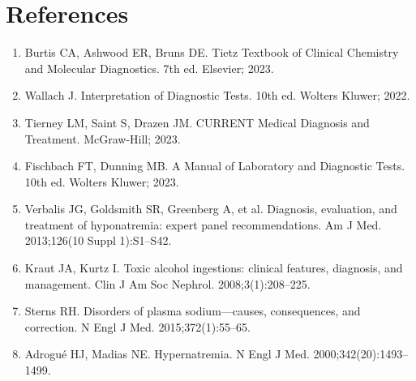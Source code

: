 \section*{References}
\begin{enumerate}
  \item Burtis CA, Ashwood ER, Bruns DE. Tietz Textbook of Clinical Chemistry and Molecular Diagnostics. 7th ed. Elsevier; 2023.
  \item Wallach J. Interpretation of Diagnostic Tests. 10th ed. Wolters Kluwer; 2022.
  \item Tierney LM, Saint S, Drazen JM. CURRENT Medical Diagnosis and Treatment. McGraw-Hill; 2023.
  \item Fischbach FT, Dunning MB. A Manual of Laboratory and Diagnostic Tests. 10th ed. Wolters Kluwer; 2023.
  \item Verbalis JG, Goldsmith SR, Greenberg A, et al. Diagnosis, evaluation, and treatment of hyponatremia: expert panel recommendations. Am J Med. 2013;126(10 Suppl 1):S1--S42.
  \item Kraut JA, Kurtz I. Toxic alcohol ingestions: clinical features, diagnosis, and management. Clin J Am Soc Nephrol. 2008;3(1):208--225.
  \item Sterns RH. Disorders of plasma sodium---causes, consequences, and correction. N Engl J Med. 2015;372(1):55--65.
  \item Adrogu\'{e} HJ, Madias NE. Hypernatremia. N Engl J Med. 2000;342(20):1493--1499.
\end{enumerate}

\clearpage
